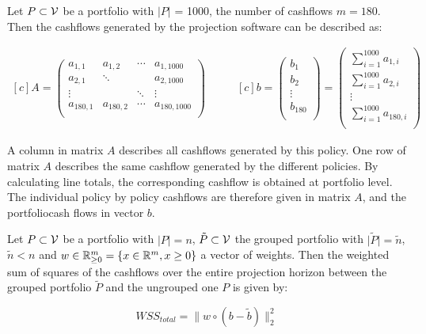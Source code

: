 \begin{example}
	Let $P \subset \mathcal{V}$ be a portfolio with $\vert P \vert$ = 1000, the number of cashflows $m = 180$. Then the cashflows generated by the projection software can be described as:
	
	\begin{equation*}
	\begin{aligned}[c]	
		A= 
		\left( 
			\begin{array}{cccc}
				a_{1,1} 	& a_{1,2} 	& \cdots 	& a_{1,1000} \\
				a_{2,1} 	& \ddots	&  			& a_{2,1000} \\
				\vdots 		&  			& \ddots 	& \vdots \\
				a_{180,1} 	& a_{180,2}	& \cdots 	& a_{180,1000} \\
			\end{array}
		\right)	
	\end{aligned}
	\qquad
	\begin{aligned}[c]
		b = 
		\left( 
			\begin{array}{c}
			b_{1} \\
			b_{2}\\
			\vdots\\
			b_{180}\\
			\end{array}
		\right)	
		=
		\left( 
			\begin{array}{c}
			\sum_{i = 1}^{1000} a_{1,i} \\
			\sum_{i = 1}^{1000} a_{2,i}\\
			\vdots\\
			\sum_{i = 1}^{1000} a_{180,i}\\
			\end{array}
		\right)	
	\end{aligned}	
	\end{equation*}
\end{example}

A column in matrix $A$ describes all cashflows generated by this policy. One row of matrix $A$ describes the same cashflow generated by the different policies. By calculating line totals, the corresponding cashflow is obtained at portfolio level. The individual policy by policy cashflows are therefore given in matrix $A$, and the portfoliocash flows in vector $b$. 

\begin{definition}
	Let $P \subset \mathcal{V}$ be a portfolio with $\vert P \vert = n$, $\tilde{P} \subset \mathcal{V}$  the grouped portfolio with $\vert \tilde{P} \vert = \tilde{n}$, $\tilde{n} < n$ and $w \in \mathbb{R}^m_{\geq 0} = \{x \in \mathbb{R}^m, x \geq 0\}$ a vector of weights. Then the weighted sum of squares of the cashflows over the entire projection horizon between the grouped portfolio $\tilde{P}$ and the ungrouped one $P$ is given by: 
	
	\begin{equation}\label{eq:objective_function}
		WSS_{total} = \lVert w \circ (b - \tilde{b})\lVert_2^2
	\end{equation}
\end{definition}

